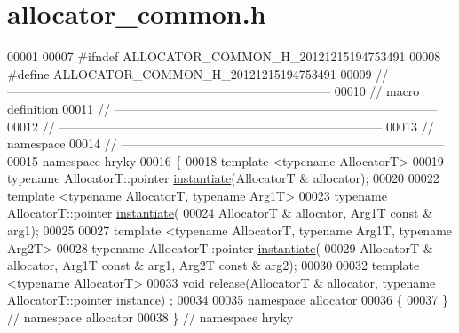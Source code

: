 \hypertarget{allocator__common_8h_source}{\section{allocator\-\_\-common.\-h}
}

\begin{DoxyCode}
00001 
00007 \textcolor{preprocessor}{#ifndef ALLOCATOR\_COMMON\_H\_20121215194753491}
00008 \textcolor{preprocessor}{}\textcolor{preprocessor}{#define ALLOCATOR\_COMMON\_H\_20121215194753491}
00009 \textcolor{preprocessor}{}\textcolor{comment}{//
      ------------------------------------------------------------------------------}
00010 \textcolor{comment}{// macro definition}
00011 \textcolor{comment}{//
      ------------------------------------------------------------------------------}
00012 \textcolor{comment}{//
      ------------------------------------------------------------------------------}
00013 \textcolor{comment}{// namespace}
00014 \textcolor{comment}{//
      ------------------------------------------------------------------------------}
00015 \textcolor{keyword}{namespace }hryky
00016 \{
00018     \textcolor{keyword}{template} <\textcolor{keyword}{typename} AllocatorT>
00019     \textcolor{keyword}{typename} AllocatorT::pointer \hyperlink{namespacehryky_a7e731db6d90571cf1aea6e113d43b6ad}{instantiate}(AllocatorT & allocator);
00020 
00022     \textcolor{keyword}{template} <\textcolor{keyword}{typename} AllocatorT, \textcolor{keyword}{typename} Arg1T>
00023     \textcolor{keyword}{typename} AllocatorT::pointer \hyperlink{namespacehryky_a7e731db6d90571cf1aea6e113d43b6ad}{instantiate}(
00024         AllocatorT & allocator, Arg1T \textcolor{keyword}{const} & arg1);
00025 
00027     \textcolor{keyword}{template} <\textcolor{keyword}{typename} AllocatorT, \textcolor{keyword}{typename} Arg1T, \textcolor{keyword}{typename} Arg2T>
00028     \textcolor{keyword}{typename} AllocatorT::pointer \hyperlink{namespacehryky_a7e731db6d90571cf1aea6e113d43b6ad}{instantiate}(
00029         AllocatorT & allocator, Arg1T \textcolor{keyword}{const} & arg1, Arg2T \textcolor{keyword}{const} & arg2);
00030 
00032     \textcolor{keyword}{template} <\textcolor{keyword}{typename} AllocatorT>
00033     \textcolor{keywordtype}{void} \hyperlink{namespacehryky_a9bdf380c3703ef316b807edae92a930a}{release}(AllocatorT & allocator, \textcolor{keyword}{typename} AllocatorT::pointer instance)
      ;
00034 
00035 \textcolor{keyword}{namespace }allocator
00036 \{
00037 \} \textcolor{comment}{// namespace allocator}
00038 \} \textcolor{comment}{// namespace hryky}

\end{DoxyCode}
